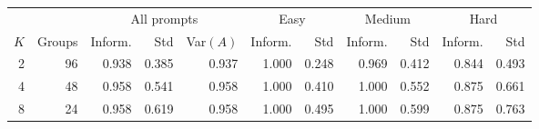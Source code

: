 \begin{tabular}{rr rrr rr rr rr}
\toprule
 & & \multicolumn{3}{c}{All prompts} & \multicolumn{2}{c}{Easy} & \multicolumn{2}{c}{Medium} & \multicolumn{2}{c}{Hard} \\
\cmidrule(lr){3-5}\cmidrule(lr){6-7}\cmidrule(lr){8-9}\cmidrule(lr){10-11}
$K$ & Groups & Inform. & Std & Var$(A)$ & Inform. & Std & Inform. & Std & Inform. & Std \\
\midrule
2 & 96 & 0.938 & 0.385 & 0.937 & 1.000 & 0.248 & 0.969 & 0.412 & 0.844 & 0.493 \\
4 & 48 & 0.958 & 0.541 & 0.958 & 1.000 & 0.410 & 1.000 & 0.552 & 0.875 & 0.661 \\
8 & 24 & 0.958 & 0.619 & 0.958 & 1.000 & 0.495 & 1.000 & 0.599 & 0.875 & 0.763 \\
\bottomrule
\end{tabular}
